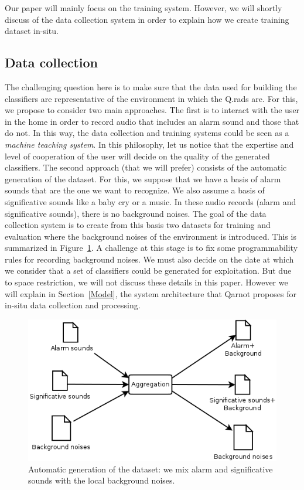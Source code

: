 \documentclass[10pt, conference, compsocconf]{IEEEtran}
\begin{document}
Our paper will mainly focus on the training system. However, we will shortly discuss of the data collection system in order 
to explain how we create training dataset in-situ.


\subsection{Data collection}

The challenging question here is to make sure that the data used for building the classifiers are representative of the environment 
in which the Q.rads are. For this, we propose to consider two main approaches. The first is to interact with the user in the 
home in order to record audio that includes an alarm sound and those that do not. In this way, the data collection and training systems 
could be seen as a {\it machine teaching system}. In this philosophy, let us notice that the expertise and level of cooperation 
of the user will decide on the quality of the generated classifiers. 
The second approach (that we will prefer) consists of the automatic generation of the dataset. 
For this, we suppose that we have a basis of alarm sounds that are the one we want to recognize. We also assume a basis of significative 
sounds like a baby cry or a music. In these audio records (alarm and significative sounds), there is no background 
noises. The goal of the data collection system is to create from this basis two datasets for training and evaluation where 
the background noises of the environment is introduced. This is summarized in Figure~\ref{fig:gen}. 
A challenge at this stage is to fix some programmability rules for recording 
background noises. We must also decide on the date at which we consider that a set of classifiers could be generated for exploitation. 
But due to space restriction, we will not discuss these details in this paper. However we will explain in Section~\ref{Model}, the 
system architecture that Qarnot proposes for in-situ data collection and processing.


	\begin{figure}[hbtp]
	\begin{center}
	\includegraphics[scale=0.3]{./Figures/Aggregation.png}
	\caption{Automatic generation of the dataset: we mix alarm and significative sounds with the local background noises.}
	\label{fig:gen}
	\end{center}
	\end{figure}
\end{document}

